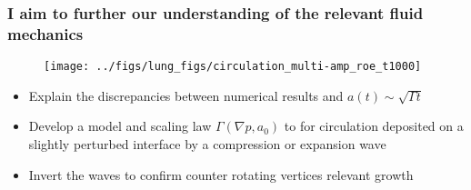 \begin{frame}\frametitle{\vspace*{0.5cm}I aim to further our understanding of the relevant fluid mechanics}
  \begin{figure}
    \centering%
    \hfill%
    \hfill%
    \texttt{[image: ../figs/lung\_figs/circulation\_multi-amp\_roe\_t1000]}%
    \hfill%
  \end{figure}
  {\small
    \begin{itemize}
    \item Explain the discrepancies between numerical results and $a(t)\sim\sqrt{\Gamma t}$%
      \vspace*{5pt}
    \item Develop a model and scaling law $\Gamma(\nabla p, a_0)$ to for circulation deposited on a
      slightly perturbed interface by a compression or expansion wave
      \vspace*{5pt}
    \item Invert the waves to confirm counter rotating vertices relevant growth
    \end{itemize}
  }
\end{frame}
%
